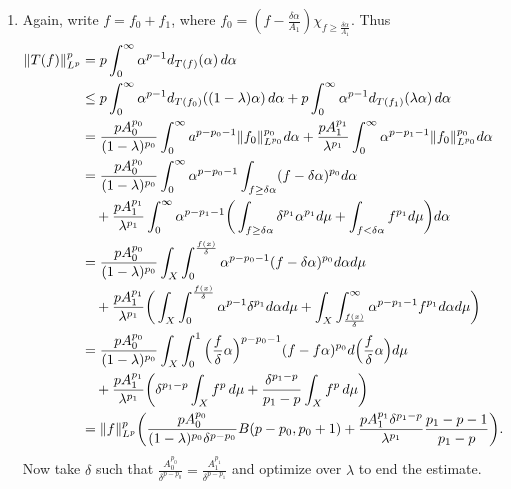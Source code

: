 \begin{enumerate}
\begin{enumerate}
   \item[(c)] Again, write $f=f_{0}+f_{1}$, where $f_{0} = (f-\frac{\delta\alpha}{A_{1}})\chi_{f \geq \frac{\delta\alpha}{A_{1}}}$. Thus
   \begin{equation*}\begin{aligned}
   \Vert T(f) \Vert_{L^p}^{p} &= p\int_{0}^{\infty}\alpha^{p-1}d_{T(f)}(\alpha)\,d\alpha
   \\&\leq p\int_{0}^{\infty}\alpha^{p-1}d_{T(f_{0})}((1-\lambda)\alpha)\,d\alpha 
   + p\int_{0}^{\infty}\alpha^{p-1}d_{T(f_{1})}(\lambda\alpha)\,d\alpha
   \\&= \frac{pA_{0}^{p_{0}}}{(1-\lambda)^{p_{0}}}
   \int_{0}^{\infty}a^{p-p_{0}-1}\Vert f_{0} \Vert_{L^{p_0}}^{p_{0}}d\alpha 
   + \frac{pA_{1}^{p_{1}}}{\lambda^{p_{1}}}
   \int_{0}^{\infty}\alpha^{p-p_{1}-1}\Vert f_{0} \Vert_{L^{p_0}}^{p_{0}}d\alpha
   \\&= \frac{pA_{0}^{p_{0}}}{(1-\lambda)^{p_{0}}} 
   \int_{0}^{\infty}\alpha^{p-p_{0}-1}
   \int_{f \geq \delta\alpha}(f - \delta\alpha)^{p_{0}}d\alpha 
   \\&\quad + \frac{pA_{1}^{p_{1}}}{\lambda^{p_{1}}} \int_{0}^{\infty}\alpha^{p-p_{1}-1}\bigg(\int_{f \geq \delta\alpha}\delta^{p_{1}}\alpha^{p_{1}}d\mu + \int_{f < \delta\alpha}f^{p_{1}}d\mu\bigg)d\alpha
   \\&= \frac{pA_{0}^{p_{0}}}{(1-\lambda)^{p_{0}}} \int_{X}\int_{0}^{\frac{f(x)}{\delta}}\alpha^{p-p_{0}-1}(f - \delta\alpha)^{p_{0}}d\alpha d\mu
   \\&\quad + \frac{pA_{1}^{p_{1}}}{\lambda^{p_{1}}} \bigg(\int_{X}\int_{0}^{\frac{f(x)}{\delta}}\alpha^{p-1}\delta^{p_{1}}d\alpha d\mu + \int_{X}\int_{\frac{f(x)}{\delta}}^{\infty}\alpha^{p-p_{1}-1}f^{p_{1}}d\alpha d\mu\bigg)
   \\&= \frac{pA_{0}^{p_{0}}}{(1-\lambda)^{p_{0}}} \int_{X}\int_{0}^{1}\Big(\frac{f}{\delta}\alpha\Big)^{p-p_{0}-1}(f - f\alpha)^{p_{0}}d\Big(\frac{f}{\delta}\alpha\Big) d\mu
   \\&\quad + \frac{pA_{1}^{p_{1}}}{\lambda^{p_{1}}}
   \bigg(\delta^{p_{1}-p}\int_{X}f^{p}\,d\mu 
   + \frac{\delta^{p_{1}-p}}{p_{1}-p}\int_{X}f^{p}\,d\mu\bigg)
   \\&= \Vert f \Vert_{L^p}^{p}\bigg(\frac{pA_{0}^{p_{0}}}
   {(1-\lambda)^{p_{0}}\delta^{p-p_{0}}}B(p-p_{0},p_{0}+1) 
   + \frac{pA_{1}^{p_{1}}\delta^{p_{1}-p}}{\lambda^{p_{1}}}
   \frac{p_{1}-p-1}{p_{1}-p}\bigg).
   \end{aligned}\end{equation*}
   Now take $\delta$ such that $\frac{A_{0}^{p_{0}}}{\delta^{p-p_{0}}} = \frac{A_{1}^{p_{1}}}{\delta^{p-p_{1}}}$ and optimize over $\lambda$ to end the estimate.
   \end{enumerate}


\end{enumerate}
